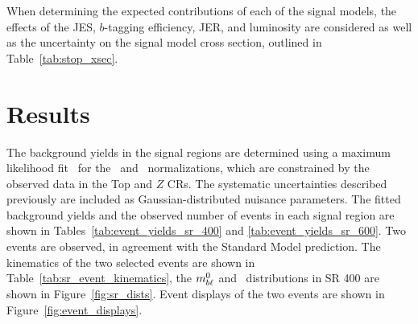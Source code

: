 \begin{table}[ht]
\caption{Summary of the effect of each considered sources of systematic
  uncertainty on the background estimate in SR~400 and SR~600. Several
  sources of theoretical systematic uncertainty which have a small
  effect on the total background estimate are grouped into the
  ``Other theory'' category.
  {\color{red} TODO update this table with broken down info and CRs.}
}
\label{tab:systematic_breakdown}
%
\end{table}

When determining the expected contributions of each of the signal models,
the effects of the JES, $b$-tagging efficiency, JER, and luminosity are
considered as well as the uncertainty on the signal model cross section,
outlined in Table~\ref{tab:stop_xsec}.

\FloatBarrier
\section{Results}
\label{sec:results}

The background yields in the signal regions are determined using a maximum
likelihood fit~\cite{Baak:2014wma} for the \TTBAR\ and
\ZGAMMAJETS\ normalizations, which are constrained by the observed data in the
Top and $Z$ CRs.
The systematic uncertainties described previously are included as
Gaussian-distributed nuisance parameters.
The fitted background yields and the observed number of events in each
signal region are shown in Tables~\ref{tab:event_yields_sr_400} and
\ref{tab:event_yields_sr_600}.
Two events are observed, in agreement with the Standard Model prediction.
The kinematics of the two selected events are shown in
Table~\ref{tab:sr_event_kinematics}, the $m_{b\ell}^0$ and \HT\ distributions in
SR 400 are shown in Figure~\ref{fig:sr_dists}.
Event displays of the two events are shown in Figure~\ref{fig:event_displays}.

